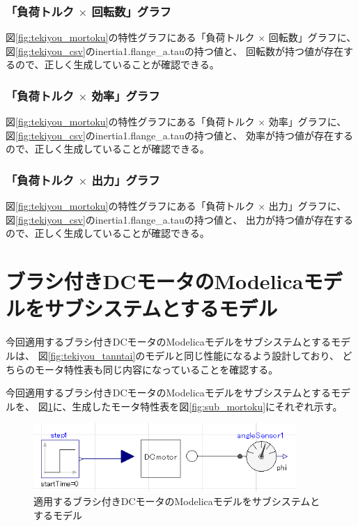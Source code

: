 \subsubsection{「負荷トルク $\times$ 回転数」グラフ}
図\ref{fig:tekiyou_mortoku}の特性グラフにある「負荷トルク $\times$ 回転数」グラフに、
図\ref{fig:tekiyou_csv}のinertia1.flange\_a.tauの持つ値と、
回転数が持つ値が存在するので、正しく生成していることが確認できる。

\subsubsection{「負荷トルク $\times$ 効率」グラフ}
図\ref{fig:tekiyou_mortoku}の特性グラフにある「負荷トルク $\times$ 効率」グラフに、
図\ref{fig:tekiyou_csv}のinertia1.flange\_a.tauの持つ値と、
効率が持つ値が存在するので、正しく生成していることが確認できる。

\subsubsection{「負荷トルク $\times$ 出力」グラフ}
図\ref{fig:tekiyou_mortoku}の特性グラフにある「負荷トルク $\times$ 出力」グラフに、
図\ref{fig:tekiyou_csv}のinertia1.flange\_a.tauの持つ値と、
出力が持つ値が存在するので、正しく生成していることが確認できる。


\section{ブラシ付きDCモータのModelicaモデルをサブシステムとするモデル}
今回適用するブラシ付きDCモータのModelicaモデルをサブシステムとするモデルは、
図\ref{fig:tekiyou_tanntai}のモデルと同じ性能になるよう設計しており、
どちらのモータ特性表も同じ内容になっていることを確認する。

今回適用するブラシ付きDCモータのModelicaモデルをサブシステムとするモデルを、
図\ref{fig:tekiyou_sub}に、生成したモータ特性表を図\ref{fig:sub_mortoku}にそれぞれ示す。

\begin{figure}[t]
	\centering
	\includegraphics[width=10cm]{./Image/tekiyou_sub.png}
	\caption{適用するブラシ付きDCモータのModelicaモデルをサブシステムとするモデル}
	\label{fig:tekiyou_sub}
\end{figure}

